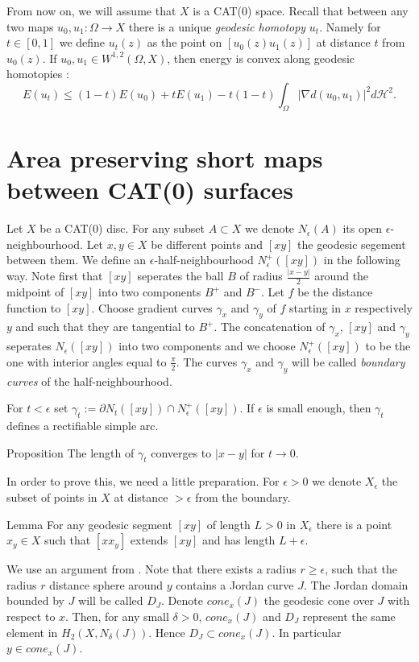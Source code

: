\documentclass[a4paper,10pt]{amsart}
\begin{document}
From now on, we will assume that $X$ is a CAT(0) space. Recall that between any two maps $u_0,u_1:\Omega\to X$ there is 
a unique {\em geodesic homotopy} $u_t$. Namely for $t\in[0,1]$ we define $u_t(z)$ as the point on $[u_0(z)u_1(z)]$ at distance $t$
from $u_0(z)$. If $u_0, u_1\in W^{1,2}(\Omega,X)$, then energy is convex along geodesic homotopies \cite[(2.2vi)]{KS}:
$$
E(u_t)\leq (1-t)E(u_0)+tE(u_1)-t(1-t)\int_\Omega|\nabla d(u_0,u_1)|^2d\mathcal{H}^2.
$$


\section{Area preserving short maps between CAT(0) surfaces}

Let $X$ be a CAT(0) disc. For any subset $A\subset X$ we denote $N_\epsilon (A)$ its open $\epsilon$-neighbourhood.
Let $x,y\in X$ be different points and $[xy]$ the geodesic segement between them. We define an $\epsilon$-half-neighbourhood
$N^+_\epsilon ([xy])$ in the following way. Note first that $[xy]$ seperates the ball $B$ of radius $\frac{|x-y|}{2}$ around
the midpoint of $[xy]$ into two components $B^+$ and $B^-$. Let $f$ be the distance function to $[xy]$. Choose gradient curves 
$\gamma_x$ and $\gamma_y$ of $f$ starting in $x$ respectively $y$ and such that they are tangential to $B^+$. The concatenation
of $\gamma_x$, $[xy]$ and $\gamma_y$ seperates $N_\epsilon([xy])$ into two components and we choose $N^+_\epsilon ([xy])$ to be the one
with interior angles equal to  $\frac{\pi}{2}$. The curves $\gamma_x$ and $\gamma_y$ will be called {\em boundary curves} of the 
half-neighbourhood.


For $t<\epsilon$ set $\gamma_t:=\partial N_t([xy])\cap N^+_\epsilon ([xy])$. If $\epsilon$
is small enough, then $\gamma_t$ defines a rectifiable simple arc.


\begin{thm}{Proposition}\label{prop:length continuity}
The length of $\gamma_t$ converges to $|x-y|$ for $t\to 0$.
\end{thm}

In order to prove this, we need a little preparation. For $\epsilon>0$ we denote
$X_\epsilon$ the subset of points in $X$ at distance $>\epsilon$ from the boundary.

\begin{thm}{Lemma}\label{lem:extension}
For any geodesic segment $[xy]$ of length $L>0$ in $X_\epsilon$ there is a point 
$x_y\in X$ such that $[x x_y]$ extends $[xy]$ and has length $L+\epsilon$.
\end{thm}
We use an argument from \cite{Kleiner}. Note that there exists a radius $r\geq\epsilon$, such 
that the radius $r$ distance sphere around $y$ contains a Jordan curve $J$. The Jordan domain bounded by $J$
will be called $D_J$.
Denote $cone_x(J)$ the geodesic cone over $J$ with respect to $x$. Then, 
for any small $\delta>0$, $cone_x(J)$ and $D_J$
represent the same element in $H_2(X,N_\delta(J))$. Hence $D_J\subset cone_x(J)$. 
In particular $y\in cone_x(J)$.
\qeds
\end{document}
